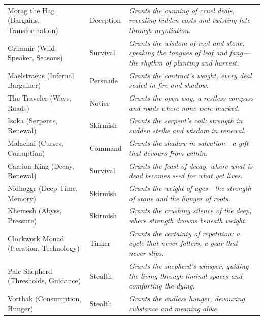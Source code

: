 \begin{longtable}{@{}p{4.2cm}p{3.2cm}p{7.2cm}@{}}
  Morag the Hag (Bargains, Transformation) & Deception &
  \emph{Grants the cunning of cruel deals, revealing hidden costs and twisting fate through negotiation.} \\
  
  Grimmir (Wild Speaker, Seasons) & Survival &
  \emph{Grants the wisdom of root and stone, speaking the tongues of leaf and fang---the rhythm of planting and harvest.} \\
  
  Maelstraeus (Infernal Bargainer) & Persuade &
  \emph{Grants the contract's weight, every deal sealed in fire and shadow.} \\
  
  The Traveler (Ways, Roads) & Notice &
  \emph{Grants the open way, a restless compass and roads where none were marked.} \\

  Isoka (Serpents, Renewal) & Skirmish &
  \emph{Grants the serpent's coil: strength in sudden strike and wisdom in renewal.} \\
  
  Malachai (Curses, Corruption) & Command &
  \emph{Grants the shadow in salvation---a gift that devours from within.} \\
  
  Carrion King (Decay, Renewal) & Survival &
  \emph{Grants the feast of decay, where what is dead becomes seed for what yet lives.} \\
  
  Nidhoggr (Deep Time, Memory) & Skirmish &
  \emph{Grants the weight of ages---the strength of stone and the hunger of roots.} \\
  
  Khemesh (Abyss, Pressure) & Skirmish &
  \emph{Grants the crushing silence of the deep, where strength drowns beneath weight.} \\
  
  Clockwork Monad (Iteration, Technology) & Tinker &
  \emph{Grants the certainty of repetition: a cycle that never falters, a gear that never slips.} \\
  
  Pale Shepherd (Thresholds, Guidance) & Stealth &
  \emph{Grants the shepherd's whisper, guiding the living through liminal spaces and comforting the dying.} \\
  
  Vorthak (Consumption, Hunger) & Stealth &
  \emph{Grants the endless hunger, devouring substance and meaning alike.} \\
  

\end{longtable}
